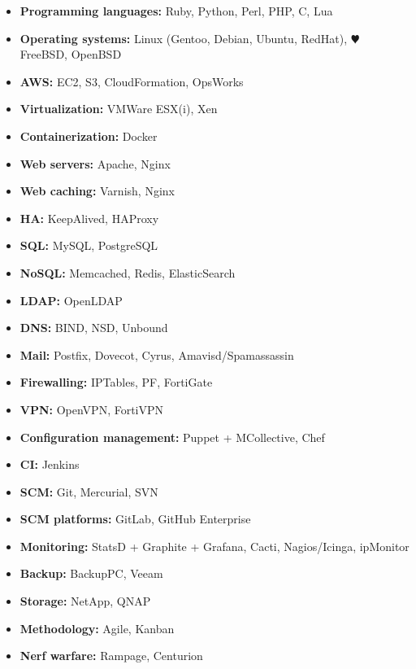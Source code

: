 \documentclass[]{friggeri-cv} %
\begin{document}
\begin{itemize}
  \item \textbf{Programming languages:} Ruby, Python, Perl, PHP, C, Lua
  \item \textbf{Operating systems:} Linux (Gentoo, Debian, Ubuntu, RedHat), {\color{red} $\varheartsuit$} FreeBSD, OpenBSD
  \item \textbf{AWS:} EC2, S3, CloudFormation, OpsWorks
  \item \textbf{Virtualization:} VMWare ESX(i), Xen
  \item \textbf{Containerization:} Docker
  \item \textbf{Web servers:} Apache, Nginx
  \item \textbf{Web caching:} Varnish, Nginx
  \item \textbf{HA:} KeepAlived, HAProxy
  \item \textbf{SQL:} MySQL, PostgreSQL
  \item \textbf{NoSQL:} Memcached, Redis, ElasticSearch
  \item \textbf{LDAP:} OpenLDAP
  \item \textbf{DNS:} BIND, NSD, Unbound
  \item \textbf{Mail:} Postfix, Dovecot, Cyrus, Amavisd/Spamassassin
  \item \textbf{Firewalling:} IPTables, PF, FortiGate
  \item \textbf{VPN:} OpenVPN, FortiVPN
  \item \textbf{Configuration management:} Puppet + MCollective, Chef
  \item \textbf{CI:} Jenkins
  \item \textbf{SCM:} Git, Mercurial, SVN
  \item \textbf{SCM platforms:} GitLab, GitHub Enterprise
  \item \textbf{Monitoring:} StatsD + Graphite + Grafana, Cacti, Nagios/Icinga, ipMonitor
  \item \textbf{Backup:} BackupPC, Veeam
  \item \textbf{Storage:} NetApp, QNAP
  \item \textbf{Methodology:} Agile, Kanban
  \item \textbf{Nerf warfare:} Rampage, Centurion
\end{itemize}

\end{document}
